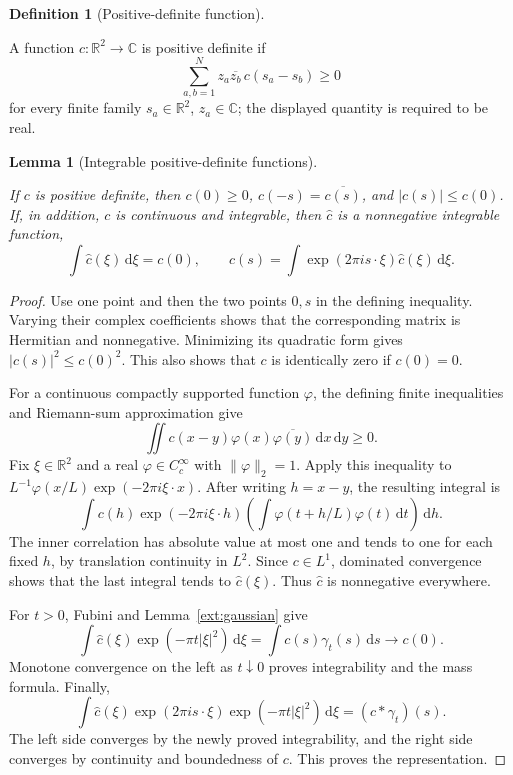\documentclass[11pt]{amsart}
\newcommand{\R}{\mathbb R}
\newcommand{\C}{\mathbb C}
\newcommand{\dd}{\,\mathrm d}
\newtheorem{lemma}[theorem]{Lemma}
\theoremstyle{definition}
\newtheorem{definition}[theorem]{Definition}
\theoremstyle{remark}
\numberwithin{equation}{section}
\providecommand{\lean}[1]{}
\providecommand{\leanok}{}
\begin{document}
\begin{definition}[Positive-definite function]\label{ext:pd-definition}
\lean{Auto.IsPositiveDefinite}
A function $c:\R^2\to\C$ is positive definite if
\[
 \sum_{a,b=1}^N z_a\overline{z_b}\,c(s_a-s_b)\ge0
\]
for every finite family $s_a\in\R^2$, $z_a\in\C$; the
displayed quantity is required to be real.
\end{definition}

\begin{lemma}[Integrable positive-definite functions]
\label{ext:pd-integrable}
\lean{Auto.ext_pd_integrable_elementary,Auto.ext_pd_integrable_fourier}
\leanok
If $c$ is positive definite, then $c(0)\ge0$,
$c(-s)=\overline{c(s)}$, and $|c(s)|\le c(0)$.
If, in addition, $c$ is continuous and integrable, then
$\widehat c$ is a nonnegative integrable function,
\[
 \int\widehat c(\xi)\dd\xi=c(0),
 \qquad
 c(s)=\int\exp(2\pi i s\cdot\xi)\widehat c(\xi)\dd\xi.
\]
\end{lemma}
\begin{proof}
Use one point and then the two points $0,s$ in the defining
inequality.  Varying their complex coefficients shows that
the corresponding matrix is Hermitian and nonnegative.
Minimizing its quadratic form gives
$|c(s)|^2\le c(0)^2$.  This also shows that $c$ is identically
zero if $c(0)=0$.

For a continuous compactly supported function $\varphi$, the
defining finite inequalities and Riemann-sum approximation give
\[
 \iint c(x-y)\varphi(x)\overline{\varphi(y)}\dd x\dd y\ge0.
\]
Fix $\xi\in\R^2$ and a real $\varphi\in C_c^\infty$ with
$\|\varphi\|_2=1$.  Apply this inequality to
$L^{-1}\varphi(x/L)\exp(-2\pi i\xi\cdot x)$.
After writing $h=x-y$, the resulting integral is
\[
 \int c(h)\exp(-2\pi i\xi\cdot h)
       \left(\int\varphi(t+h/L)\varphi(t)\dd t\right)\dd h.
\]
The inner correlation has absolute value at most one and
tends to one for each fixed $h$, by translation continuity
in $L^2$.  Since $c\in L^1$, dominated convergence shows
that the last integral tends to $\widehat c(\xi)$.  Thus
$\widehat c$ is nonnegative everywhere.

For $t>0$, Fubini and Lemma~\ref{ext:gaussian} give
\[
 \int\widehat c(\xi)\exp(-\pi t|\xi|^2)\dd\xi
       =\int c(s)\gamma_t(s)\dd s\longrightarrow c(0).
\]
Monotone convergence on the left as $t\downarrow0$ proves
integrability and the mass formula.  Finally,
\[
 \int\widehat c(\xi)\exp(2\pi i s\cdot\xi)
                         \exp(-\pi t|\xi|^2)\dd\xi
       =(c*\gamma_t)(s).
\]
The left side converges by the newly proved integrability,
and the right side converges by continuity and boundedness
of $c$.  This proves the representation.
\end{proof}
\end{document}
